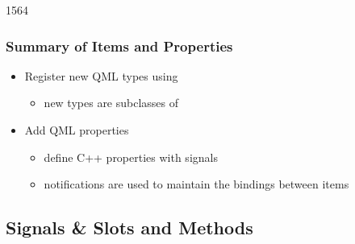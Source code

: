 \begin{slide}{1564}\frametitle{Summary of Items and Properties}

\begin{itemize}
\item Register new QML types using 
  \begin{itemize}
  \item new types are subclasses of 
  \end{itemize}
\vspace*{0.5em}
\item Add QML properties
  \begin{itemize}
  \item define C++ properties with  signals
  \item notifications are used to maintain the bindings between items
  \end{itemize}
\end{itemize}

\end{slide}       

\subsection{Signals \& Slots and Methods}

